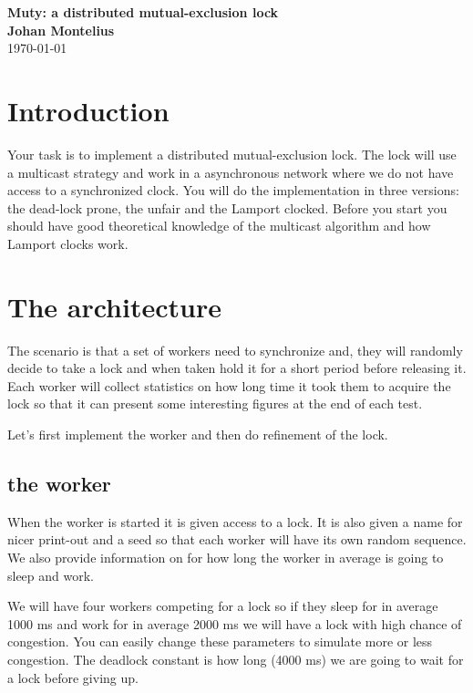 \documentclass[a4paper, 11pt]{article}
\newcommand{\nnsection}[1]{
\section*{#1}
\addcontentsline{toc}{section}{#1}
}
\begin{document}
\begin{center}
\vspace{20pt}
\textbf{\large Muty: a distributed mutual-exclusion lock}\\
\vspace{10pt}
\textbf{Johan Montelius}\\
\vspace{10pt}
\today{}
\end{center}

\nnsection{Introduction}

Your task is to implement a distributed mutual-exclusion lock. The lock
will use a multicast strategy and work in a asynchronous network where
we do not have access to a synchronized clock. You will do the
implementation in three versions: the dead-lock prone, the unfair and
the Lamport clocked. Before you start you should have good theoretical
knowledge of the multicast algorithm and how Lamport clocks work. 


\section{The architecture}

The scenario is that a set of workers need to synchronize and, they
will randomly decide to take a lock and when taken hold it for a short
period before releasing it. Each worker will collect statistics on how
long time it took them to acquire the lock so that it can present some
interesting figures at the end of each test.


Let's first implement the worker and then do refinement of the lock.


\subsection{the worker}

When the worker is started it is given access to a lock. It is also
given a name for nicer print-out and a seed so that each worker will
have its own random sequence. We also provide information on for how
long the worker in average is going to sleep and work. 

We will have four workers competing for a lock so if they sleep for in
average 1000 ms and work for in average 2000 ms we will have a lock
with high chance of congestion. You can easily change these parameters
to simulate more or less congestion. The deadlock constant is how long
(4000 ms) we are going to wait for a lock before giving up.
\end{document}
